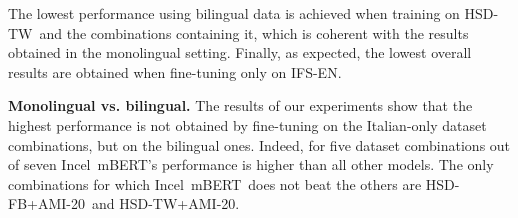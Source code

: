 \documentclass[11pt]{article}
\newcommand{\dsENclassification}{IFS-EN}
\newcommand{\dsITclassification}{IFS-IT}
\newcommand{\mbert}{\mbox{mBERT$_{base}$}}
\newcommand{\imbert}{\mbox{Incel mBERT}}
\newcommand{\hsdfb}{\mbox{HSD-FB}}
\newcommand{\hsdtw}{\mbox{HSD-TW}}
\newcommand{\ami}{\mbox{AMI-20}}
\begin{document}
The lowest performance using bilingual data is achieved when training on \hsdtw\, and the combinations containing it, which is coherent with the results obtained in the monolingual setting. Finally, as expected, the lowest overall results are obtained when fine-tuning only on \dsENclassification.


\vspace*{1mm}
\noindent\textbf{Monolingual vs. bilingual.}
The results of our experiments show that the highest performance is not obtained by fine-tuning on the Italian-only dataset combinations, but on the bilingual ones. Indeed, for five dataset combinations out of seven \imbert's performance is higher than all other models.
The only combinations for which \imbert\, does not beat the others are \hsdfb+\ami\, and \hsdtw+\ami.
\end{document}
